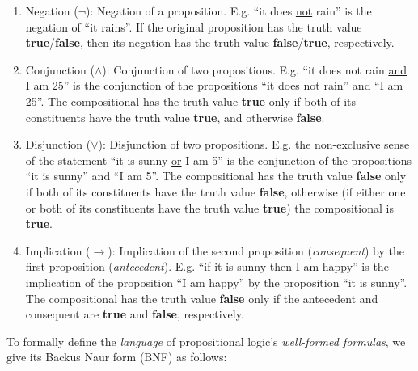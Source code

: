 \documentclass[12pt]{article}
\newcommand{\imp}{\ensuremath{\rightarrow}}
\newcommand{\true}{\textbf{true}}
\newcommand{\false}{\textbf{false}}
\begin{document}
\begin{enumerate}
	\item Negation ($\neg$): Negation of a proposition. E.g.
		``it does \underline{not} rain'' is the negation of ``it rains''.
		If the original proposition has the truth value
		\true{}/\false{}, then its negation has the truth value
		\false{}/\true{}, respectively.
	\item Conjunction ($\land$): Conjunction of two propositions. E.g.
		``it does not rain \underline{and} I am 25'' is the conjunction of
		the propositions ``it does not rain'' and ``I am 25''. The
		compositional has the truth value \true{} only if both of its
		constituents have the truth value \true{}, and otherwise \false{}.
	\item Disjunction ($\lor$): Disjunction of two propositions. E.g.
		the non-exclusive sense of the statement
		``it is sunny \underline{or} I am 5'' is the conjunction of the propositions
		``it is sunny'' and ``I am 5''. The compositional has the truth
		value \false{} only if both of its constituents have the truth
		value \false{}, otherwise (if either one or both of its constituents
		have the truth value \true{}) the compositional is \true{}.
	\item Implication ($\imp$): Implication of the second proposition
		(\textit{consequent}) by the first proposition (\textit{antecedent}).
		E.g. ``\underline{if} it is sunny \underline{then} I am happy'' is the
		implication of the proposition ``I am happy'' by the proposition
		``it is sunny''. The compositional has the truth value \false{} only
		if the antecedent and consequent are \true{} and \false{}, respectively.
\end{enumerate}

To formally define the \textit{language} of propositional logic's
\textit{well-formed formulas}, we give its Backus Naur form (BNF)
as follows:
\begin{bnf*}
	\bnfprod{$\phi$}
	{
		 \bnfor
		\bnfts{$\Big(\neg$} \bnfpn{$\phi$} \bnfts{$\Big)$} \bnfor
		\bnfts{$\Big($} \bnfpn{$\phi$} \bnfts{$\land$}
			\bnfpn{$\phi$} \bnfts{$\Big)$} \bnfor
		\bnfts{$\Big($} \bnfpn{$\phi$} \bnfts{$\lor$}
			\bnfpn{$\phi$} \bnfts{$\Big)$} \bnfor
		\bnfts{$\Big($} \bnfpn{$\phi$} \bnfts{$\imp$}
			\bnfpn{$\phi$} \bnfts{$\Big)$}
	}\\
	{
		 \bnfor {} \bnfor {} \bnfor
		\bnfts{\bnfsk} \bnfor
		 \bnfor {} \bnfor \bnfts{\bnfsk}
	}
\end{bnf*}
\end{document}
